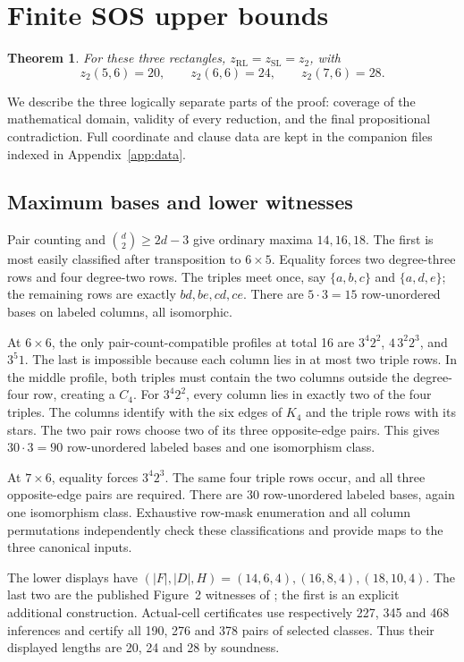 \documentclass[11pt,a4paper]{article}
\newtheorem{theorem}{Theorem}[section]
\theoremstyle{definition}
\newcommand{\zr}{z_{\mathrm{RL}}}
\newcommand{\zs}{z_{\mathrm{SL}}}
\newcommand{\zt}{z_2}
\begin{document}
\section{Finite SOS upper bounds}
\label{sec:finite}

\begin{theorem}\label{thm:small}
For these three rectangles, $\zr=\zs=\zt$, with
\[
 \zt(5,6)=20,\qquad \zt(6,6)=24,\qquad \zt(7,6)=28.
\]
\end{theorem}

We describe the three logically separate parts of the proof: coverage
of the mathematical domain, validity of every reduction, and the final
propositional contradiction. Full coordinate and clause data are kept in
the companion files indexed in Appendix~\ref{app:data}.

\subsection{Maximum bases and lower witnesses}

Pair counting and $\binom d2\ge2d-3$ give ordinary maxima $14,16,18$.
The first is most easily classified after transposition to $6\times5$.
Equality forces two degree-three rows and four degree-two rows. The
triples meet once, say $\{a,b,c\}$ and $\{a,d,e\}$; the remaining rows
are exactly $bd,be,cd,ce$. There are $5\cdot3=15$ row-unordered bases
on labeled columns, all isomorphic.

At $6\times6$, the only pair-count-compatible profiles at total 16 are
$3^4 2^2$, $4\,3^2 2^3$, and $3^5 1$. The last is impossible because
each column lies in at most two triple rows. In the middle profile,
both triples must contain the two columns outside the degree-four row,
creating a $C_4$. For $3^4 2^2$, every column lies in exactly two of the
four triples. The columns identify with the six edges of $K_4$ and the
triple rows with its stars. The two pair rows choose two of its three
opposite-edge pairs. This gives $30\cdot3=90$ row-unordered labeled
bases and one isomorphism class.

At $7\times6$, equality forces $3^4 2^3$. The same four triple rows
occur, and all three opposite-edge pairs are required. There are 30
row-unordered labeled bases, again one isomorphism class. Exhaustive row-mask
enumeration and all column permutations independently check these
classifications and provide maps to the three canonical inputs.

The lower displays have $(|F|,|D|,H)=(14,6,4),(16,8,4),(18,10,4)$.
The last two are the published Figure~2 witnesses of \cite{CCQ}; the
first is an explicit additional construction. Actual-cell certificates
use respectively 227, 345 and 468 inferences and certify all 190, 276
and 378 pairs of selected classes. Thus their displayed lengths are
20, 24 and 28 by soundness.
\end{document}
